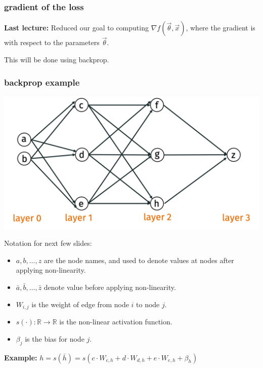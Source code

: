 \documentclass[handout,compress]{beamer}
\newcommand{\R}{\mathbb{R}}
\begin{document}
	\begin{frame}
		\frametitle{gradient of the loss}
		\textbf{Last lecture:} Reduced our goal to computing $\nabla f(\vec{\theta}, \vec{x})$, where the gradient is with respect to the parameters $\vec{\theta}$.
		
		This will be done using backprop.
	\end{frame}
	
	\begin{frame}
		\frametitle{backprop example}
		\small
		\vspace{-.5em}
		\begin{center}
			\includegraphics[width=.6\textwidth]{backpro_example.png}
			\vspace{-1em}
		\end{center}
		Notation for next few slides:
		\vspace{-1em}
		\begin{itemize}
			\item $a, b, \ldots, z$ are the node names, and used to denote values at nodes after applying non-linearity.
			\item $\bar{a}, \bar{b}, \ldots, \bar{z}$ denote value before applying non-linearity.
			\item $W_{i,j}$ is the weight of edge from node $i$ to node $j$. 
			\item $s(\cdot): \R\rightarrow \R$ is the non-linear activation function. 
			\item $\beta_{j}$ is the bias for node $j$.
		\end{itemize}
		\textbf{Example:} $h = s(\bar{h}) = s(c\cdot W_{c,h} + d\cdot W_{d,h} + e\cdot W_{e,h} + \beta_h)$
	\end{frame}
	
\end{document}
